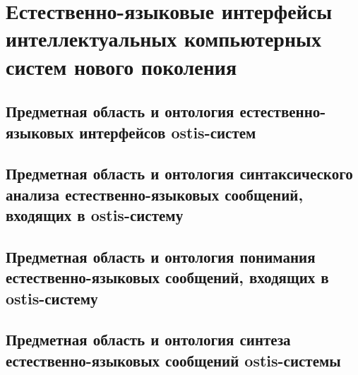 \chapter{Естественно-языковые интерфейсы интеллектуальных компьютерных систем нового поколения}
\label{chapter_nl_interfaces}


\section{Предметная область и онтология естественно-языковых интерфейсов ostis-систем}
\section{Предметная область и онтология синтаксического анализа естественно-языковых сообщений, входящих в ostis-систему}
\section{Предметная область и онтология понимания естественно-языковых сообщений, входящих в ostis-систему}
\section{Предметная область и онтология синтеза естественно-языковых сообщений ostis-системы}

%